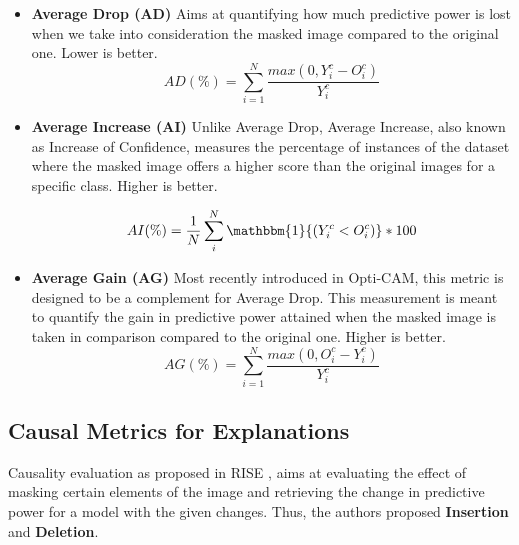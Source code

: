 \begin{itemize}
    \item \textbf{Average Drop (AD)} 
    Aims at quantifying how much predictive power is lost when we take into consideration the masked image compared to the original one. Lower is better.
    \begin{equation}
        AD(\%) = \sum_{i=1}^N \frac{max(0,Y_i^c- O_i^c)}{Y_i^c}
    \end{equation}
    \label{Average Drop}
    
    \item \textbf{Average Increase (AI)}
    Unlike Average Drop, Average Increase, also known as Increase of Confidence, measures the percentage of instances of the dataset where the masked image offers a higher score than the original images for a specific class. Higher is better.
    
    \begin{equation}
        AI(\%) = \frac{1}{N} \sum_i^N \mathbbm{1}{(Y_i^c<O_i^c)}*100
    \end{equation}

    \item \textbf{Average Gain (AG)} 
    Most recently introduced in Opti-CAM, %
    this metric is designed to be a complement for Average Drop. This measurement is meant to quantify the gain in predictive power attained when the masked image is taken in comparison compared to the original one.
     Higher is better.
    \begin{equation}
        AG(\%) = \sum_{i=1}^N \frac{max(0, O_i^c-Y_i^c)}{Y_i^c}
    \end{equation}
\end{itemize}


\subsection{Causal Metrics for Explanations}
Causality evaluation as proposed in RISE \cite{petsiuk2018rise}, aims at evaluating the effect of masking certain elements of the image and retrieving the change in predictive power for a model with the given changes. Thus, the authors proposed \textbf{Insertion} and \textbf{Deletion}.

